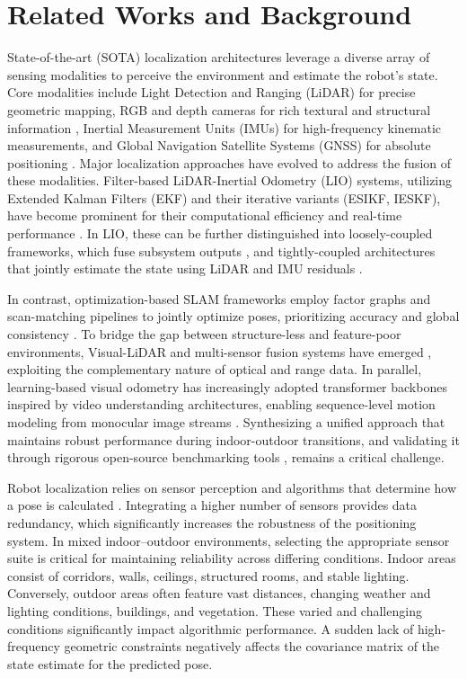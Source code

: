 \documentclass[pdflatex,sn-mathphys-num]{sn-jnl}
\theoremstyle{thmstyleone}%
\theoremstyle{thmstyletwo}%
\theoremstyle{thmstylethree}%
\begin{document}
\section{Related Works and Background}
\label{sec:related}

State-of-the-art (SOTA) localization architectures leverage a diverse array of sensing modalities to perceive the environment and estimate the robot's state. Core modalities include Light Detection and Ranging (LiDAR) for precise geometric mapping, RGB and depth cameras for rich textural and structural information \cite{Visual-lidar}, Inertial Measurement Units (IMUs) for high-frequency kinematic measurements, and Global Navigation Satellite Systems (GNSS) for absolute positioning \cite{Robot-Localization-GNNS}. Major localization approaches have evolved to address the fusion of these modalities. Filter-based LiDAR-Inertial Odometry (LIO) systems, utilizing Extended Kalman Filters (EKF) and their iterative variants (ESIKF, IESKF), have become prominent for their computational efficiency and real-time performance \cite{FAST-LIO2}. In LIO, these can be further distinguished into loosely-coupled frameworks, which fuse subsystem outputs \cite{zhang2021coarse}, and tightly-coupled architectures that jointly estimate the state using LiDAR and IMU residuals \cite{bedkowski2026mapshd}.

In contrast, optimization-based SLAM frameworks employ factor graphs and scan-matching pipelines to jointly optimize poses, prioritizing accuracy and global consistency \cite{Koide_2024}. To bridge the gap between structure-less and feature-poor environments, Visual-LiDAR and multi-sensor fusion systems have emerged \cite{3d-2dlidar}, exploiting the complementary nature of optical and range data. In parallel, learning-based visual odometry has increasingly adopted transformer backbones inspired by video understanding architectures, enabling sequence-level motion modeling from monocular image streams \cite{franccani2025transformer,bertasius2021space,arnab2021vivit}. Synthesizing a unified approach that maintains robust performance during indoor-outdoor transitions, and validating it through rigorous open-source benchmarking tools \cite{BEDKOWSKI2024101618, bedkowski2026mapshd}, remains a critical challenge.

Robot localization relies on sensor perception and algorithms that determine how a pose is calculated \cite{Borenstein1996WhereAI}. Integrating a higher number of sensors provides data redundancy, which significantly increases the robustness of the positioning system. In mixed indoor–outdoor environments, selecting the appropriate sensor suite is critical for maintaining reliability across differing conditions. Indoor areas consist of corridors, walls, ceilings, structured rooms, and stable lighting. Conversely, outdoor areas often feature vast distances, changing weather and lighting conditions, buildings, and vegetation. These varied and challenging conditions significantly impact algorithmic performance. A sudden lack of high-frequency geometric constraints negatively affects the covariance matrix of the state estimate for the predicted pose.
\end{document}
